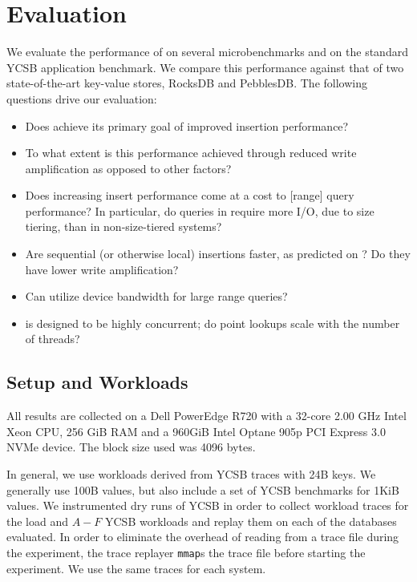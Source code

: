 \section{Evaluation}\label{sec:eval}

We evaluate the performance of \sysname{} on several microbenchmarks and on the
standard YCSB application benchmark\cite{DBLP:conf/cloud/CooperSTRS10}. We
compare this performance against that of two state-of-the-art key-value stores,
RocksDB and PebblesDB.  The following questions drive our evaluation:
\begin{itemize}
   \item Does \sysname achieve its primary goal of improved insertion
      performance?
   \item To what extent is this performance achieved through reduced write
      amplification as opposed to other factors?
   \item Does increasing insert performance come at a cost to [range] query
     performance?  In particular, do queries in \sysname require more I/O, due to
     size tiering, than in non-size-tiered systems?
   \item Are sequential (or otherwise local) insertions faster, as predicted on
     \sysname? Do they have lower write amplification?
   \item Can \sysname utilize device bandwidth for large range queries?
   \item \sysname is designed to be highly concurrent; do point lookups scale
      with the number of threads?
\end{itemize}

\subsection{Setup and Workloads}\label{sec:setup}

All results are collected on a Dell PowerEdge R720 with a 32-core
2.00 GHz Intel Xeon CPU, 256 GiB RAM and a 960GiB Intel Optane 905p PCI Express
3.0 NVMe device. The block size used was 4096 bytes.

In general, we use workloads derived from YCSB traces with 24B keys. We
generally use 100B values, but also include a set of YCSB benchmarks for 1KiB
values.  We instrumented dry runs of YCSB in order to collect workload traces
for the load and $A-F$ YCSB workloads and replay them on each of the databases
evaluated.  In order to eliminate the overhead of reading from a trace file
during the experiment, the trace replayer \texttt{mmap}s the trace file before
starting the experiment.  We use the same traces for each system.

